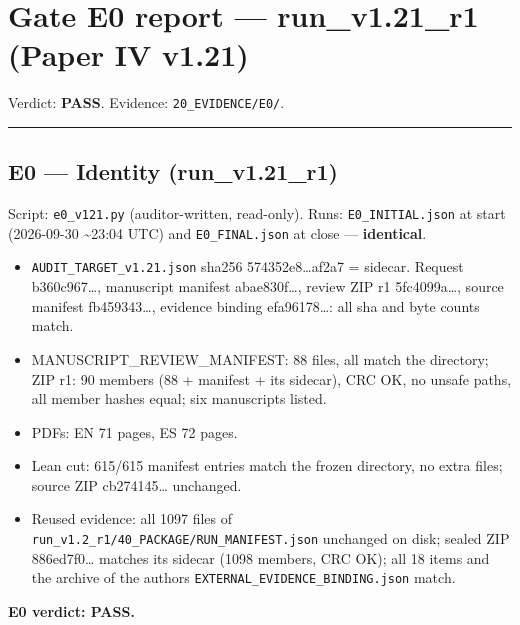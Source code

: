 \documentclass[
]{article}
\author{}
\date{}
\providecommand{\tightlist}{%
  \setlength{\itemsep}{0pt}\setlength{\parskip}{0pt}}
\begin{document}
\section{Gate E0 report --- run\_v1.21\_r1 (Paper IV
v1.21)}\label{gate-e0-report--run_v121_r1-paper-iv-v121}

Verdict: \textbf{PASS}. Evidence: \texttt{20\_EVIDENCE/E0/}.

\begin{center}\rule{0.5\linewidth}{0.5pt}\end{center}

\subsection{E0 --- Identity
(run\_v1.21\_r1)}\label{e0--identity-run_v121_r1}

Script: \texttt{e0\_v121.py} (auditor-written, read-only). Runs:
\texttt{E0\_INITIAL.json} at start (2026-09-30 \textasciitilde23:04 UTC)
and \texttt{E0\_FINAL.json} at close --- \textbf{identical}.

\begin{itemize}
\tightlist
\item
  \texttt{AUDIT\_TARGET\_v1.21.json} sha256 574352e8\ldots af2a7 =
  sidecar. Request b360c967\ldots, manuscript manifest abae830f\ldots,
  review ZIP r1 5fc4099a\ldots, source manifest fb459343\ldots, evidence
  binding efa96178\ldots: all sha and byte counts match.
\item
  MANUSCRIPT\_REVIEW\_MANIFEST: 88 files, all match the directory; ZIP
  r1: 90 members (88 + manifest + its sidecar), CRC OK, no unsafe paths,
  all member hashes equal; six manuscripts listed.
\item
  PDFs: EN 71 pages, ES 72 pages.
\item
  Lean cut: 615/615 manifest entries match the frozen directory, no
  extra files; source ZIP cb274145\ldots{} unchanged.
\item
  Reused evidence: all 1097 files of
  \texttt{run\_v1.2\_r1/40\_PACKAGE/RUN\_MANIFEST.json} unchanged on
  disk; sealed ZIP 886ed7f0\ldots{} matches its sidecar (1098 members,
  CRC OK); all 18 items and the archive of the author\textquotesingle s
  \texttt{EXTERNAL\_EVIDENCE\_BINDING.json} match.
\end{itemize}

\textbf{E0 verdict: PASS.}
\end{document}
